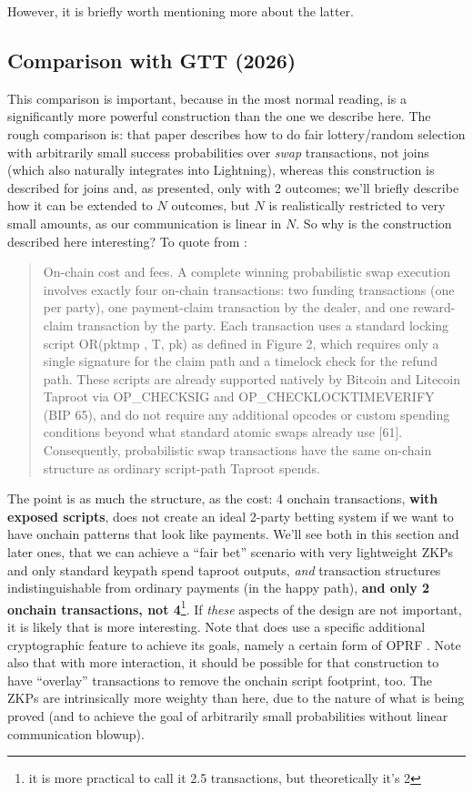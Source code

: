 \documentclass[11pt]{article}
\begin{document}
However, it is briefly worth mentioning more about the latter.

\subsection{Comparison with GTT (2026) \cite{gerhardt2026}}

This comparison is important, because in the most normal reading, \cite{gerhardt2026} is a significantly more powerful construction than the one we describe here. The rough comparison is: that paper describes how to do fair lottery/random selection with arbitrarily small success probabilities over \emph{swap} transactions, not joins (which also naturally integrates into Lightning), whereas this construction is described for joins and, as presented, only with 2 outcomes; we'll briefly describe how it can be extended to $N$ outcomes, but $N$ is realistically restricted to very small amounts, as our communication is linear in $N$. So why is the construction described here interesting? To quote from \cite{gerhardt2026} :

\begin{quote}
On-chain cost and fees. A complete winning probabilistic swap execution involves exactly four on-chain
transactions: two funding transactions (one per party), one payment-claim transaction by the dealer, and
one reward-claim transaction by the party. Each transaction uses a standard locking script OR(pktmp , T, pk)
as defined in Figure 2, which requires only a single signature for the claim path and a timelock check
for the refund path. These scripts are already supported natively by Bitcoin and Litecoin Taproot via
OP\_CHECKSIG and OP\_CHECKLOCKTIMEVERIFY (BIP 65), and do not require any additional opcodes or custom
spending conditions beyond what standard atomic swaps already use [61]. Consequently, probabilistic swap
transactions have the same on-chain structure as ordinary script-path Taproot spends.
\end{quote}

The point is as much the structure, as the cost: 4 onchain transactions, \textbf{with exposed scripts}, does not create an ideal 2-party betting system if we want to have onchain patterns that look like payments. We'll see both in this section and later ones, that we can achieve a ``fair bet'' scenario with very lightweight ZKPs and only standard keypath spend taproot outputs, \emph{and} transaction structures indistinguishable from ordinary payments (in the happy path), \textbf{and only 2 onchain transactions, not 4}\footnote{it is more practical to call it 2.5 transactions, but theoretically it's 2}. If \emph{these} aspects of the design are not important, it is likely that \cite{gerhardt2026} is more interesting. Note that \cite{gerhardt2026} does use a specific additional cryptographic feature to achieve its goals, namely a certain form of OPRF \cite{oprf}. Note also that with more interaction, it should be possible for that construction to have ``overlay'' transactions to remove the onchain script footprint, too. The ZKPs are intrinsically more weighty than here, due to the nature of what is being proved (and to achieve the goal of arbitrarily small probabilities without linear communication blowup).
\end{document}
